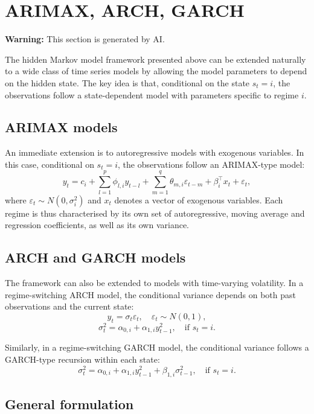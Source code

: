 \documentclass[11pt]{article}
\begin{document}
\section{ARIMAX, ARCH, GARCH}

\begin{center}
\textbf{Warning:} This section is generated by AI.
\end{center}

The hidden Markov model framework presented above can be extended naturally to 
a wide class of time series models by allowing the model parameters to depend 
on the hidden state. The key idea is that, conditional on the state $s_t = i$, 
the observations follow a state-dependent model with parameters specific to regime $i$.

\subsection{ARIMAX models}

An immediate extension is to autoregressive models with exogenous variables. 
In this case, conditional on $s_t = i$, the observations follow an ARIMAX-type model:
$$
y_t = c_i + \sum_{l=1}^p \phi_{l,i} y_{t-l} + \sum_{m=1}^q \theta_{m,i} 
\varepsilon_{t-m} + \beta_i^\top x_t + \varepsilon_t,
$$
where $\varepsilon_t \sim N(0, \sigma_i^2)$ and $x_t$ denotes a vector of 
exogenous variables. Each regime is thus characterised by its own set of 
autoregressive, moving average and regression coefficients, as well as its own variance.

\subsection{ARCH and GARCH models}

The framework can also be extended to models with time-varying volatility. 
In a regime-switching ARCH model, the conditional variance depends on both past 
observations and the current state:
$$
y_t = \sigma_t \varepsilon_t, \quad \varepsilon_t \sim N(0,1),
$$
$$
\sigma_t^2 = \alpha_{0,i} + \alpha_{1,i} y_{t-1}^2, \quad \text{if } s_t = i.
$$

Similarly, in a regime-switching GARCH model, the conditional variance follows 
a GARCH-type recursion within each state:
$$
\sigma_t^2 = \alpha_{0,i} + \alpha_{1,i} y_{t-1}^2 + \beta_{1,i} \sigma_{t-1}^2, 
\quad \text{if } s_t = i.
$$

\subsection{General formulation}
\end{document}
